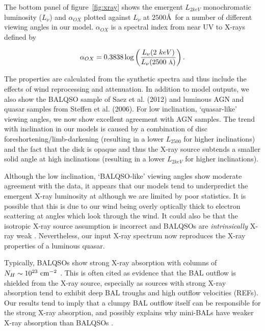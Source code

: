\documentclass[preprint, a4paper, 11pt]{aastex}
\begin{document}
The bottom panel of figure~\ref{fig:xray} shows the emergent $L_{2keV}$ 
monochromatic luminosity ($L_\nu$) and $\alpha_{OX}$ plotted against 
$L_\nu$ at $2500$\AA\ for a number of different viewing angles in our model.
$\alpha_{OX}$ is a spectral index from near UV to X-rays defined by

\begin{equation}
\alpha_{OX}=0.3838\log\left(\frac{L_{\nu}(2~keV)}{L_{\nu}(2500~\mbox{\scriptsize{\AA}})}\right).
\end{equation}

The properties are calculated from the synthetic spectra and thus include
the effects of wind reprocessing and attenuation. In addition to model outputs,
we also show the BALQSO sample of Saez et al. (2012) and luminous AGN and quasar
samples from Steffen et al. (2006). For low inclination, `quasar-like' viewing angles,
we now show excellent agreement with AGN samples. The trend with inclination
in our models is caused by a combination of disc foreshortening/limb-darkening 
(resulting in a lower $L_{2500}$ for higher inclinations) and the fact that the disk 
is opaque and thus the X-ray source subtends a smaller solid angle at high inclinations
(resulting in a lower $L_{2keV}$ for higher inclinations). 

Although the low inclination, `BALQSO-like' viewing angles show moderate agreement with the data,
it appears that our models tend to underpredict the emergent X-ray luminosity at 
although we are limited by poor statistics. 
It is possible that this is due to our wind being overly optically thick to 
electron scattering at angles which look through the wind. It could also be that the
isotropic X-ray source assumption is incorrect and BALQSOs are {\em intrinsically} 
X-ray weak \citep[e.g.][]{morabito2013}. Nevertheless, our input X-ray spectrum
now reproduces the X-ray properties of a luminous quasar.

Typically, BALQSOs show strong X-ray absorption with columns 
of $N_H\sim10^{23}~\rm{cm^{-2}}$ 
\citep{green1996,brandt2000,mathur2000,green2001,grupemathur2003}.
This is often cited as evidence that the BAL outflow is shielded from
the X-ray source, especially as sources with strong X-ray absorption tend
to exhibit deep BAL troughs and high outflow velocities (REFs).
Our results tend to imply that a clumpy BAL outflow
itself can be responsible for the strong X-ray absorption, and possibly 
explains why mini-BALs have weaker X-ray absorption than BALQSOs 
\citep[e.g.][]{brandt2000,hamann2013}.
\end{document}
